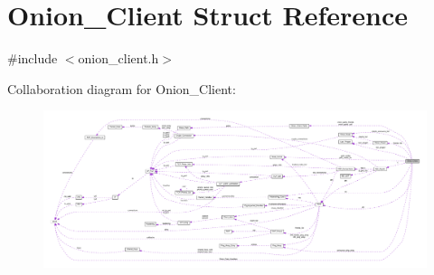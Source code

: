 \hypertarget{struct_onion___client}{\section{Onion\+\_\+\+Client Struct Reference}
\label{struct_onion___client}
}


{\ttfamily \#include $<$onion\+\_\+client.\+h$>$}



Collaboration diagram for Onion\+\_\+\+Client\+:
\nopagebreak
\begin{figure}[H]
\begin{center}
\leavevmode
\includegraphics[width=350pt]{d1/d48/struct_onion___client__coll__graph}
\end{center}
\end{figure}
